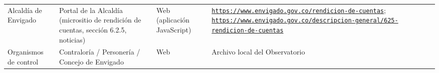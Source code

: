 \documentclass[11pt,letterpaper]{article}
\begin{document}
{\begin{xltabular}{\linewidth}{L{2.8cm}YL{1.6cm}Y}
Alcaldía de Envigado & Portal de la Alcaldía (micrositio de rendición de cuentas, sección 6.\allowbreak{}2.\allowbreak{}5, noticias) & Web (aplicación JavaScript) & \texttt{\footnotesize \href{https://www.envigado.gov.co/rendicion-de-cuentas}{https:/\allowbreak{}}\allowbreak{}\href{https://www.envigado.gov.co/rendicion-de-cuentas}{/\allowbreak{}}\allowbreak{}\href{https://www.envigado.gov.co/rendicion-de-cuentas}{www.\allowbreak{}envigado.\allowbreak{}gov.\allowbreak{}co/\allowbreak{}}\allowbreak{}\href{https://www.envigado.gov.co/rendicion-de-cuentas}{rendicion-\allowbreak{}de-\allowbreak{}cuentas}}; \newline \texttt{\footnotesize \href{https://www.envigado.gov.co/descripcion-general/625-rendicion-de-cuentas}{https:/\allowbreak{}}\allowbreak{}\href{https://www.envigado.gov.co/descripcion-general/625-rendicion-de-cuentas}{/\allowbreak{}}\allowbreak{}\href{https://www.envigado.gov.co/descripcion-general/625-rendicion-de-cuentas}{www.\allowbreak{}envigado.\allowbreak{}gov.\allowbreak{}co/\allowbreak{}}\allowbreak{}\href{https://www.envigado.gov.co/descripcion-general/625-rendicion-de-cuentas}{descripcion-\allowbreak{}general/\allowbreak{}}\allowbreak{}\href{https://www.envigado.gov.co/descripcion-general/625-rendicion-de-cuentas}{625-\allowbreak{}rendicion-\allowbreak{}de-\allowbreak{}cuentas}} \\
Organismos de control & Contraloría /\allowbreak{} Personería /\allowbreak{} Concejo de Envigado & Web & Archivo local del Observatorio \\

\end{xltabular}}
\end{document}
